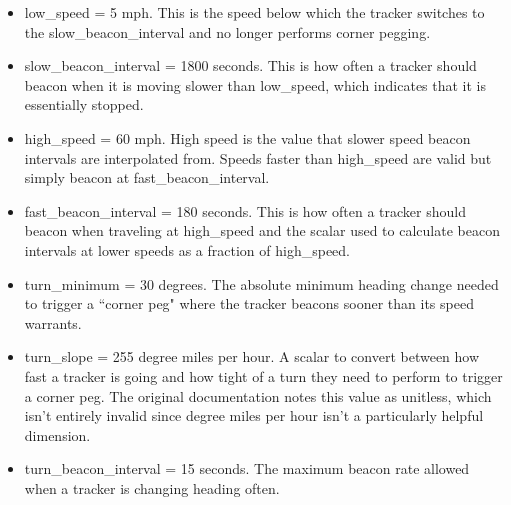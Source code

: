 \begin{itemize}
	\item low\_speed = 5 mph. This is the speed below which the tracker
		switches to the slow\_beacon\_interval 
		and no longer performs corner pegging.
	\item slow\_beacon\_interval = 1800 seconds. This is how often a tracker
		should beacon when it is moving slower than low\_speed, which indicates
		that it is essentially stopped.
	\item high\_speed = 60 mph. High speed is the value that slower speed
		beacon intervals are interpolated from. Speeds faster than high\_speed
		are valid but simply beacon at fast\_beacon\_interval.
	\item fast\_beacon\_interval = 180 seconds. This is how often a tracker should
		beacon when traveling at high\_speed and the scalar used to 
		calculate beacon intervals at lower speeds as a fraction of high\_speed.
	\item turn\_minimum = 30 degrees. The absolute minimum heading change needed 
		to trigger
		a ``corner peg" where the tracker beacons sooner than its speed warrants.
	\item turn\_slope = 255 degree miles per hour. 
		A scalar to convert between how fast a tracker is going and 
		how tight of a turn they need to perform to trigger a corner peg.
		The original documentation notes this value as unitless,
		which isn't entirely invalid since degree miles per hour isn't 
		a particularly helpful dimension.
	\item turn\_beacon\_interval = 15 seconds. The maximum beacon rate allowed 
		when a tracker is changing heading often.
	
\end{itemize}

